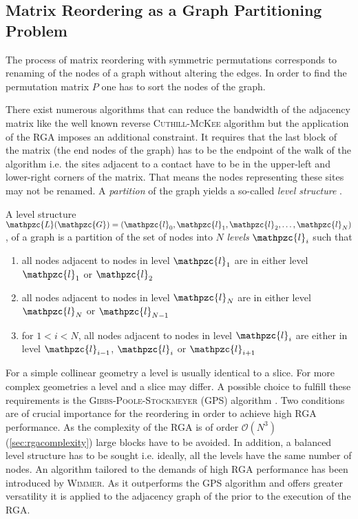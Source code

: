 \subsection{Matrix Reordering as a Graph Partitioning Problem}
The process of matrix reordering with symmetric permutations corresponds to renaming of the nodes of a graph without altering the edges. In order to find the permutation matrix $P$ one has to sort the nodes of the graph.\par
There exist numerous algorithms that can reduce the bandwidth of the adjacency matrix like the well known reverse \textsc{Cuthill-McKee} algorithm but the application of the RGA imposes an additional constraint. It requires that the last block of the matrix (the end nodes of the graph) has to be the endpoint of the walk of the algorithm i.e. the sites adjacent to a contact have to be in the upper-left and lower-right corners of the matrix. That means the nodes representing these sites may not be renamed. A \emph{partition} of the graph yields a so-called \emph{level structure} \cite{gibbs.Siam.13.236}.
\begin{dfn}
A level structure $\mathpzc{L}(\mathpzc{G}) = (\mathpzc{l}_0,\mathpzc{l}_1,\mathpzc{l}_2,\dotsc,\mathpzc{l}_N)$, of a graph  is a partition of the set of nodes  into $N$ \emph{levels} $\mathpzc{l}_i$ such that
\begin{enumerate}
\item all nodes adjacent to nodes in level $\mathpzc{l}_1$ are in either level $\mathpzc{l}_1$ or $\mathpzc{l}_2$
\item all nodes adjacent to nodes in level $\mathpzc{l}_N$ are in either level $\mathpzc{l}_{N}$ or $\mathpzc{l}_{N-1}$
\item for $1 < i < N$, all nodes adjacent to nodes in level $\mathpzc{l}_{i}$ are either in level $\mathpzc{l}_{i-1}$, $\mathpzc{l}_{i}$ or $\mathpzc{l}_{i+1}$
\end{enumerate}
\end{dfn}
For a simple collinear geometry a level is usually identical to a slice. For more complex geometries a level and a slice may differ. A possible choice to fulfill these requirements is the \textsc{Gibbs-Poole-Stockmeyer} (GPS) algorithm \cite{gibbs.Siam.13.236}. Two conditions are of crucial importance for the reordering in order to achieve high RGA performance. As the complexity of the RGA is of order $\mathcal{O}(N^3)$(\cref{sec:rgacomplexity}) large blocks have to be avoided. In addition, a balanced level structure has to be sought i.e. ideally,  all the levels have the same number of nodes.
An algorithm tailored to the demands of high RGA performance has been introduced by \textsc{Wimmer}. As it outperforms the GPS algorithm and offers greater versatility \cite{Wimmer2009JComPhys} it is applied to the adjacency graph of the \hamil{} prior to the execution of the RGA.
